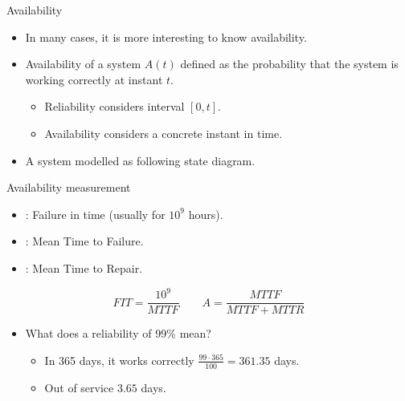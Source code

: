 \begin{frame}[t]{Availability}
\begin{itemize}
  \item In many cases, it is more interesting to know availability.
  \item Availability of a system $A(t)$ defined as the
        probability that the system is working correctly at instant $t$.
    \begin{itemize}
      \item Reliability considers interval $[0,t]$.
      \item Availability considers a concrete instant in time.
    \end{itemize}
  \item A system modelled as following state diagram.
\end{itemize}
\begin{center}
\end{center}
\end{frame}

\begin{frame}[t]{Availability measurement}
\begin{itemize}
  \item {}: Failure in time (usually for $10^9$ hours).
  \item {}: Mean Time to Failure.
  \item {}: Mean Time to Repair.
\end{itemize}

\begin{equation*}
FIT = \frac{10^9}{MTTF}
\quad\quad
A = \frac{MTTF}{MTTF + MTTR}
\end{equation*}

\begin{itemize}
  \item What does a reliability of 99\% mean?	
    \begin{itemize}
      \item In 365 days, it works correctly $\frac{99 \cdot 365}{100} = 361.35$ days.
      \item Out of service $3.65$ days.
    \end{itemize}
\end{itemize}
\end{frame}


